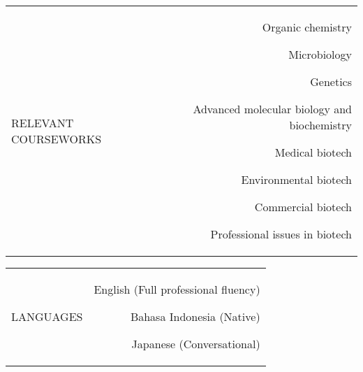 \documentclass[a4paper,10pt]{article}
\newcommand\VRule{\color{lightgray}\vrule}
\newcommand\HRule{}
\begin{document}
\vspace{0.15in}
\begin{tabular}{L!{\VRule}R}
\uppercase{Relevant Courseworks \HRule} &
\begin{inparaenum}[$\circ$]
  \item Organic chemistry
  \item Microbiology
  \item Genetics
  \item Advanced molecular biology and biochemistry
  \item Medical biotech
  \item Environmental biotech
  \item Commercial biotech
  \item Professional issues in biotech
\end{inparaenum}
\end{tabular}


\vspace{0.15in}
\begin{tabular}{L!{\VRule}R}
\uppercase{Languages \HRule} &
\begin{inparaenum}[$\circ$]
  \item English (Full professional fluency)
  \item Bahasa Indonesia (Native)
  \item Japanese (Conversational)

\end{inparaenum}
\end{tabular}


\end{document}
